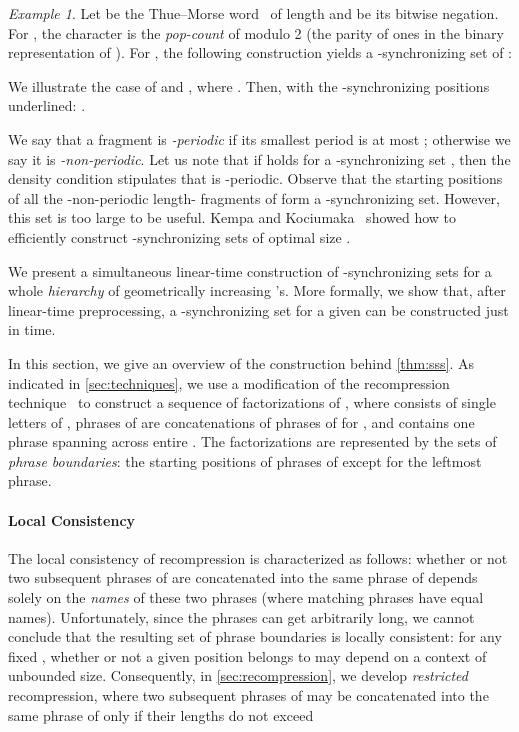 \documentclass[a4paper]{article}
\theoremstyle{definition}
\theoremstyle{remark}
\newtheorem{example}[theorem]{Example}
\begin{document}
\begin{example}
  Let   be the Thue--Morse word~\cite{Thue2} of length  and  be its bitwise negation.
  For , the character  is the \emph{pop-count} of  modulo 2 (the parity of ones in the binary representation of ).
  For , the following construction yields a -synchronizing set of :
  
  We illustrate the case of  and , where .
  Then,   with the -synchronizing positions underlined:
  .
  \end{example}

We say that a fragment is \emph{-periodic} if its smallest period is at most ; otherwise
we say it is \emph{-non-periodic}.
Let us note that if  holds for a -synchronizing set ,
then the density condition stipulates that  is -periodic.
Observe that the starting positions of all the -non-periodic length- fragments of 
form a -synchronizing set. However, this set is too large to be useful. 
Kempa and Kociumaka~\cite{Kempa2019} showed how to efficiently construct -synchronizing sets
of optimal size .

\prpsynch*

We present a simultaneous linear-time construction of -synchronizing sets for
a whole \emph{hierarchy} of geometrically increasing 's.
More formally, we show that, after linear-time preprocessing, a 
-synchronizing set for a given  can be constructed just in  time.

\thmsss*

In this section, we give an overview of the construction behind \cref{thm:sss}.
As indicated in \cref{sec:techniques}, we use a modification of the recompression technique~\cite{DBLP:journals/jacm/Jez16} to construct a sequence  of factorizations of , where
 consists of single letters of , phrases of  are concatenations of phrases of  for ,
and  contains one phrase spanning across entire .
The factorizations are represented by the sets  of \emph{phrase boundaries}: the starting positions of phrases of  except for the leftmost phrase.

\paragraph*{\bf Local Consistency}
The local consistency of recompression is characterized as follows: whether or not two subsequent phrases of  are concatenated into the same phrase of  depends solely on the \emph{names} of these two phrases (where matching phrases have equal names). 
Unfortunately, since the phrases can get arbitrarily long, we cannot conclude that the resulting set  of phrase boundaries is locally consistent:
for any fixed , whether or not a given  position belongs to  may depend on a context of unbounded size.
Consequently, in \cref{sec:recompression}, we develop \emph{restricted} recompression, where two subsequent phrases of  may be concatenated into the same phrase of  only if their lengths do not exceed
\end{document}
